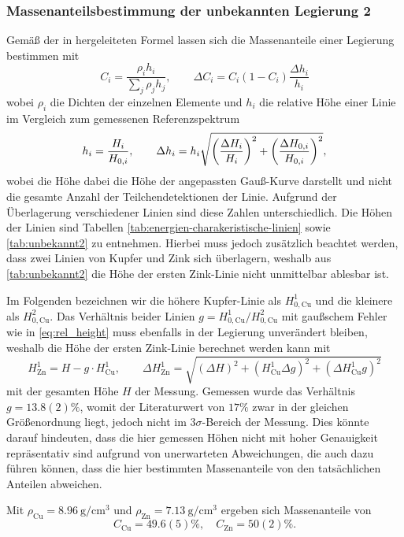 \subsubsection*{Massenanteilsbestimmung der unbekannten Legierung 2}\label{subsubsec:massenanteile}
Gemäß der in \cite{skript} hergeleiteten Formel lassen sich die Massenanteile einer Legierung bestimmen mit 
\begin{equation}
    C_i = \frac{\rho_ih_i}{\sum_j\rho_j h_j}, \qquad \Delta C_i = C_i(1-C_i)\frac{\Delta h_i}{h_i}
\end{equation}
wobei $\rho_i$ die Dichten der einzelnen Elemente und $h_i$ die relative Höhe einer Linie 
im Vergleich zum gemessenen Referenzspektrum 
\begin{equation}
    h_i = \frac{H_i}{H_{0, i}},\qquad \Delta h_i = h_i\sqrt{\qty(\frac{\Delta H_i}{H_i})^2 + \qty(\frac{\Delta H_{0, i}}{H_{0, i}})^2},
    \label{eq:rel_height}
\end{equation}
wobei die Höhe dabei die Höhe der angepassten Gauß-Kurve darstellt 
und nicht die gesamte Anzahl der Teilchendetektionen der Linie. Aufgrund der Überlagerung verschiedener Linien 
sind diese Zahlen unterschiedlich. 
Die Höhen der Linien sind Tabellen \ref{tab:energien-charakeristische-linien} sowie \ref{tab:unbekannt2} zu entnehmen.
Hierbei muss jedoch zusätzlich beachtet werden, dass zwei Linien von Kupfer und Zink sich überlagern,
weshalb aus \cref{tab:unbekannt2} die Höhe der ersten Zink-Linie nicht unmittelbar ablesbar ist.\par 
Im Folgenden bezeichnen wir die höhere Kupfer-Linie als $H^1_{0, \mathrm{Cu}}$ und die kleinere als $H^2_{0, \mathrm{Cu}}$.
Das Verhältnis beider Linien $g = H^1_{0, \mathrm{Cu}} / H^2_{0, \mathrm{Cu}}$ mit gaußschem Fehler wie in \ref{eq:rel_height} muss ebenfalls 
in der Legierung unverändert bleiben, weshalb die Höhe der ersten Zink-Linie berechnet werden kann mit 
\begin{equation*}
    H^1_\mathrm{Zn} = H - g\cdot H^1_\mathrm{Cu}, \qquad 
    \Delta H^1_\mathrm{Zn} = \sqrt{(\Delta H)^2 + ( H^1_\mathrm{Cu}\Delta g)^2 + (\Delta  H^1_\mathrm{Cu} g)^2}
\end{equation*}
mit der gesamten Höhe $H$ der Messung. Gemessen wurde das Verhältnis $g=13.8(2)\%$, womit 
der Literaturwert \cite{xraydata} von $17\%$ zwar in der gleichen Größenordnung liegt, jedoch nicht im 
$3\sigma$-Bereich der Messung. Dies könnte darauf hindeuten, dass die hier gemessen Höhen 
nicht mit hoher Genauigkeit repräsentativ sind aufgrund von unerwarteten Abweichungen, die auch dazu führen können,
dass die hier bestimmten Massenanteile von den tatsächlichen Anteilen abweichen.\par
Mit $\rho_\mathrm{Cu} =\SI{8.96}{\gram\per\cubic\cm}$ und $\rho_\mathrm{Zn} =\SI{7.13}{\gram\per\cubic\cm}$ 
\cite{Workman:2022ynf} 
ergeben sich Massenanteile von 
\begin{equation}
    C_\mathrm{Cu} = 49.6(5)\%,\quad C_\mathrm{Zn} = 50(2)\%.
\end{equation}

